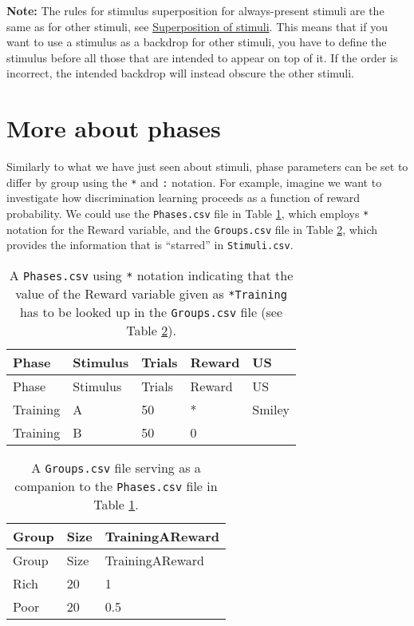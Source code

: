 \documentclass[11pt,]{article}
\begin{document}
\textbf{Note:} The rules for stimulus superposition for always-present
stimuli are the same as for other stimuli, see
\hyperref[stimulus-superposition]{Superposition of stimuli}. This means
that if you want to use a stimulus as a backdrop for other stimuli, you
have to define the stimulus before all those that are intended to appear
on top of it. If the order is incorrect, the intended backdrop will
instead obscure the other stimuli.

\section{More about phases}\label{more-about-phases}

Similarly to what we have just seen about stimuli, phase parameters can
be set to differ by group using the \texttt{*} and \texttt{:} notation.
For example, imagine we want to investigate how discrimination learning
proceeds as a function of reward probability. We could use the
\texttt{Phases.csv} file in Table \ref{phases-star-notation}, which
employs \texttt{*} notation for the Reward variable, and the
\texttt{Groups.csv} file in Table \ref{groups-phases-star-notation},
which provides the information that is ``starred'' in
\texttt{Stimuli.csv}.

\begin{longtable}[c]{@{}lllll@{}}
\caption{A \texttt{Phases.csv} using \texttt{*} notation indicating that
the value of the Reward variable given as \texttt{*Training} has to be
looked up in the \texttt{Groups.csv} file (see Table
\ref{groups-phases-star-notation}).
\label{phases-star-notation}}\tabularnewline
\toprule
Phase & Stimulus & Trials & Reward & US\tabularnewline
\midrule
\endfirsthead
\toprule
Phase & Stimulus & Trials & Reward & US\tabularnewline
\midrule
\endhead
Training & A & 50 & * & Smiley\tabularnewline
Training & B & 50 & 0 &\tabularnewline
\bottomrule
\end{longtable}

\begin{longtable}[c]{@{}lll@{}}
\caption{A \texttt{Groups.csv} file serving as a companion to the
\texttt{Phases.csv} file in Table \ref{phases-star-notation}.
\label{groups-phases-star-notation}}\tabularnewline
\toprule
Group & Size & TrainingAReward\tabularnewline
\midrule
\endfirsthead
\toprule
Group & Size & TrainingAReward\tabularnewline
\midrule
\endhead
Rich & 20 & 1\tabularnewline
Poor & 20 & 0.5\tabularnewline
\bottomrule
\end{longtable}
\end{document}
